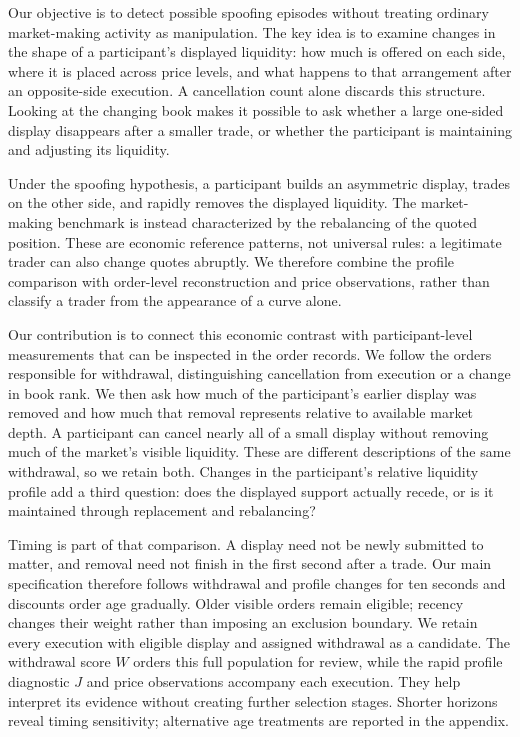 \documentclass[11pt]{article}
\newenvironment{review}{\begingroup\color{blue}}{\endgroup}
\begin{document}
Our objective is to detect possible spoofing episodes without treating ordinary market-making activity as manipulation. The key idea is to examine changes in the shape of a participant's displayed liquidity: how much is offered on each side, where it is placed across price levels, and what happens to that arrangement after an opposite-side execution. A cancellation count alone discards this structure. Looking at the changing book makes it possible to ask whether a large one-sided display disappears after a smaller trade, or whether the participant is maintaining and adjusting its liquidity.

Under the spoofing hypothesis, a participant builds an asymmetric display, trades on the other side, and rapidly removes the displayed liquidity. \begin{review}The market-making benchmark is instead characterized by the rebalancing of the quoted position.\end{review} These are economic reference patterns, not universal rules: a legitimate trader can also change quotes abruptly. We therefore combine the profile comparison with order-level reconstruction and price observations, rather than classify a trader from the appearance of a curve alone.

Our contribution is to connect this economic contrast with participant-level measurements that can be inspected in the order records. We follow the orders responsible for withdrawal, distinguishing cancellation from execution or a change in book rank. We then ask how much of the participant's earlier display was removed and how much that removal represents relative to available market depth. A participant can cancel nearly all of a small display without removing much of the market's visible liquidity. These are different descriptions of the same withdrawal, so we retain both. Changes in the participant's relative liquidity profile add a third question: does the displayed support actually recede, or is it maintained through replacement and rebalancing?

Timing is part of that comparison. A display need not be newly submitted to matter, and removal need not finish in the first second after a trade. Our main specification therefore follows withdrawal and profile changes for ten seconds and discounts order age gradually. Older visible orders remain eligible; recency changes their weight rather than imposing an exclusion boundary. We retain every execution with eligible display and assigned withdrawal as a candidate. The withdrawal score $W$ orders this full population for review, while the rapid profile diagnostic $J$ and price observations accompany each execution. They help interpret its evidence without creating further selection stages. Shorter horizons reveal timing sensitivity; alternative age treatments are reported in the appendix.
\end{document}
